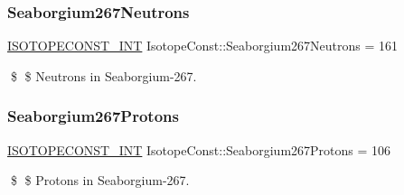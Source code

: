 \subsubsection{\texorpdfstring{Seaborgium267\+Neutrons}{Seaborgium267Neutrons}}
{\footnotesize\ttfamily \mbox{\hyperlink{group___isotope_const-_macros_ga5f18360b3e99483a35c32d789e62621c}{I\+S\+O\+T\+O\+P\+E\+C\+O\+N\+S\+T\+\_\+\+I\+NT}} Isotope\+Const\+::\+Seaborgium267\+Neutrons = 161}

\$ \$ Neutrons in Seaborgium-\/267. \mbox{\label{group___isotope_const-_seaborgium-_sg267_ga4ba0383cb6af453e4663633903cc767b}} 
\subsubsection{\texorpdfstring{Seaborgium267\+Protons}{Seaborgium267Protons}}
{\footnotesize\ttfamily \mbox{\hyperlink{group___isotope_const-_macros_ga5f18360b3e99483a35c32d789e62621c}{I\+S\+O\+T\+O\+P\+E\+C\+O\+N\+S\+T\+\_\+\+I\+NT}} Isotope\+Const\+::\+Seaborgium267\+Protons = 106}

\$ \$ Protons in Seaborgium-\/267. 